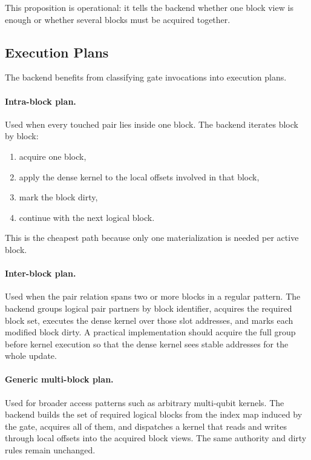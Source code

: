 \documentclass[runningheads]{llncs}
\begin{document}
This proposition is operational: it tells the backend whether one block view is enough or whether several blocks must be acquired together.

\subsection{Execution Plans}

The backend benefits from classifying gate invocations into execution plans.

\paragraph{Intra-block plan.}
Used when every touched pair lies inside one block. The backend iterates block by block:
\begin{enumerate}[leftmargin=1.5em]
  \item acquire one block,
  \item apply the dense kernel to the local offsets involved in that block,
  \item mark the block dirty,
  \item continue with the next logical block.
\end{enumerate}
This is the cheapest path because only one materialization is needed per active block.

\paragraph{Inter-block plan.}
Used when the pair relation spans two or more blocks in a regular pattern. The backend groups logical pair partners by block identifier, acquires the required block set, executes the dense kernel over those slot addresses, and marks each modified block dirty. A practical implementation should acquire the full group before kernel execution so that the dense kernel sees stable addresses for the whole update.

\paragraph{Generic multi-block plan.}
Used for broader access patterns such as arbitrary multi-qubit kernels. The backend builds the set of required logical blocks from the index map induced by the gate, acquires all of them, and dispatches a kernel that reads and writes through local offsets into the acquired block views. The same authority and dirty rules remain unchanged.
\end{document}
